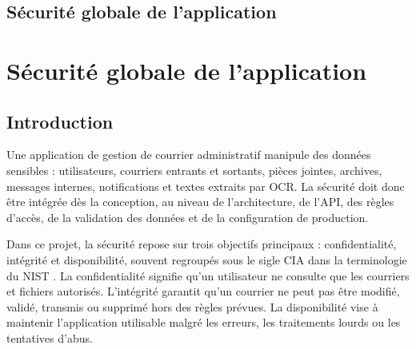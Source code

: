 %

\providecommand{\SecurityAppName}{Gestion Courrier}
\providecommand{\SecurityStack}{Laravel 12, Sanctum, React, API REST}
\providecommand{\SecurityChapterTitle}{Sécurité globale de l'application}

\makeatletter
{}
  {\section{\SecurityChapterTitle}}
  {\chapter{\SecurityChapterTitle}}
\makeatother
\label{chap:securite-globale}

\section{Introduction}
\label{sec:securite-introduction}

Une application de gestion de courrier administratif manipule des données sensibles : utilisateurs, courriers entrants et sortants, pièces jointes, archives, messages internes, notifications et textes extraits par OCR. La sécurité doit donc être intégrée dès la conception, au niveau de l'architecture, de l'API, des règles d'accès, de la validation des données et de la configuration de production.

Dans ce projet, la sécurité repose sur trois objectifs principaux : confidentialité, intégrité et disponibilité, souvent regroupés sous le sigle CIA dans la terminologie du NIST \cite{nist-cia}. La confidentialité signifie qu'un utilisateur ne consulte que les courriers et fichiers autorisés. L'intégrité garantit qu'un courrier ne peut pas être modifié, validé, transmis ou supprimé hors des règles prévues. La disponibilité vise à maintenir l'application utilisable malgré les erreurs, les traitements lourds ou les tentatives d'abus.


